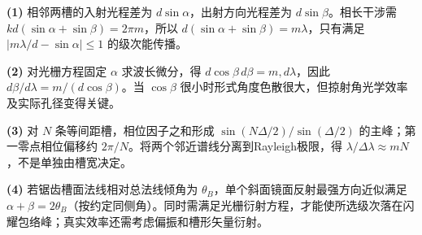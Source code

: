 \par\noindent\textbf{(1)} 相邻两槽的入射光程差为 \(d\sin\alpha\)，出射方向光程差为 \(d\sin\beta\)。相长干涉需 \(k d(\sin\alpha+\sin\beta)=2\pi m\)，所以 \(d(\sin\alpha+\sin\beta)=m\lambda\)，只有满足 \(|m\lambda/d-\sin\alpha|\le1\) 的级次能传播。
\par\noindent\textbf{(2)} 对光栅方程固定 \(\alpha\) 求波长微分，得 \(d\cos\beta\,d\beta=m,d\lambda\)，因此 \(d\beta/d\lambda=m/(d\cos\beta)\)。当 \(\cos\beta\) 很小时形式角度色散很大，但掠射角光学效率及实际孔径变得关键。
\par\noindent\textbf{(3)} 对 \(N\) 条等间距槽，相位因子之和形成 \(\sin(N\Delta/2)/\sin(\Delta/2)\) 的主峰；第一零点相位偏移约 \(2\pi/N\)。将两个邻近谱线分离到Rayleigh极限，得 \(\lambda/\Delta\lambda\approx mN\)，不是单独由槽宽决定。
\par\noindent\textbf{(4)} 若锯齿槽面法线相对总法线倾角为 \(\theta_B\)，单个斜面镜面反射最强方向近似满足 \(\alpha+\beta=2\theta_B\)（按约定同侧角）。同时需满足光栅衍射方程，才能使所选级次落在闪耀包络峰；真实效率还需考虑偏振和槽形矢量衍射。
